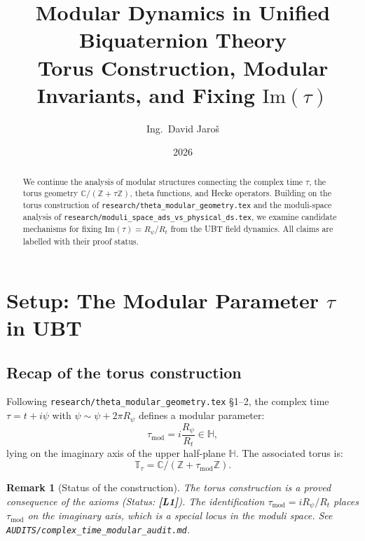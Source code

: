 \documentclass[11pt,a4paper]{article}
\title{Modular Dynamics in Unified Biquaternion Theory\\
\large Torus Construction, Modular Invariants, and Fixing \texorpdfstring{$\mathrm{Im}(\tau)$}{Im(tau)}}
\author{Ing.\ David Jaroš}
\date{2026}
\newtheorem{remark}{Remark}
\begin{document}
\maketitle

\begin{abstract}
We continue the analysis of modular structures connecting the complex time
$\tau$, the torus geometry $\mathbb{C}/(\mathbb{Z}+\tau\mathbb{Z})$, theta
functions, and Hecke operators.  Building on the torus construction of
\texttt{research/theta\_modular\_geometry.tex} and the moduli-space analysis
of \texttt{research/moduli\_space\_ads\_vs\_physical\_ds.tex}, we examine
candidate mechanisms for fixing $\mathrm{Im}(\tau) = R_\psi/R_t$ from the
UBT field dynamics.  All claims are labelled with their proof status.
\end{abstract}

\tableofcontents

\section{Setup: The Modular Parameter \texorpdfstring{$\tau$}{tau} in UBT}
\label{sec:tau}

\subsection{Recap of the torus construction}

Following \texttt{research/theta\_modular\_geometry.tex} §1--2, the complex
time $\tau = t + i\psi$ with $\psi \sim \psi + 2\pi R_\psi$ defines a
modular parameter:
\begin{equation}
  \tau_{\mathrm{mod}} = i\frac{R_\psi}{R_t} \in \mathbb{H},
\end{equation}
lying on the imaginary axis of the upper half-plane $\mathbb{H}$.  The
associated torus is:
\begin{equation}
  \mathbb{T}_\tau = \mathbb{C}/(\mathbb{Z} + \tau_{\mathrm{mod}}\mathbb{Z}).
\end{equation}

\begin{remark}[Status of the construction]
  The torus construction is a proved consequence of the axioms (Status:
  \textbf{[L1]}).  The identification $\tau_{\mathrm{mod}} = iR_\psi/R_t$
  places $\tau_{\mathrm{mod}}$ on the imaginary axis, which is a special
  locus in the moduli space.  See
  \texttt{AUDITS/complex\_time\_modular\_audit.md}.
\end{remark}
\end{document}
